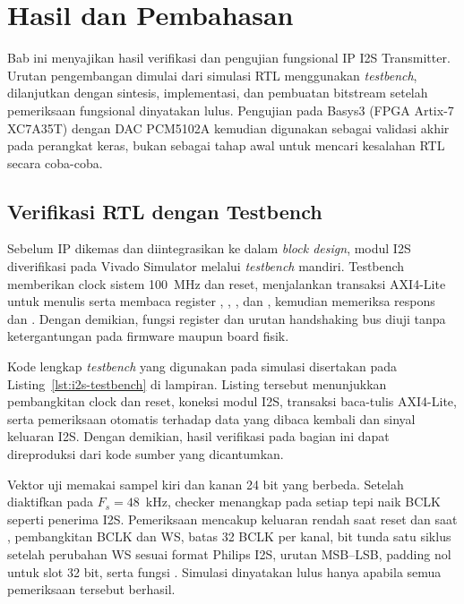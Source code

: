 \chapter{Hasil dan Pembahasan}

Bab ini menyajikan hasil verifikasi dan pengujian fungsional IP I2S Transmitter. Urutan pengembangan dimulai dari simulasi RTL menggunakan \textit{testbench}, dilanjutkan dengan sintesis, implementasi, dan pembuatan bitstream setelah pemeriksaan fungsional dinyatakan lulus. Pengujian pada Basys3 (FPGA Artix-7 XC7A35T) dengan DAC PCM5102A kemudian digunakan sebagai validasi akhir pada perangkat keras, bukan sebagai tahap awal untuk mencari kesalahan RTL secara coba-coba.

\section{Verifikasi RTL dengan Testbench}

Sebelum IP dikemas dan diintegrasikan ke dalam \textit{block design}, modul I2S diverifikasi pada Vivado Simulator melalui \textit{testbench} mandiri. Testbench memberikan clock sistem 100~MHz dan reset, menjalankan transaksi AXI4-Lite untuk menulis serta membaca register , , , dan , kemudian memeriksa respons  dan . Dengan demikian, fungsi register dan urutan handshaking bus diuji tanpa ketergantungan pada firmware maupun board fisik.

Kode lengkap \textit{testbench} yang digunakan pada simulasi disertakan pada Listing~\ref{lst:i2s-testbench} di lampiran. Listing tersebut menunjukkan pembangkitan clock dan reset, koneksi modul I2S, transaksi baca-tulis AXI4-Lite, serta pemeriksaan otomatis terhadap data yang dibaca kembali dan sinyal keluaran I2S. Dengan demikian, hasil verifikasi pada bagian ini dapat direproduksi dari kode sumber yang dicantumkan.

Vektor uji memakai sampel kiri dan kanan 24 bit yang berbeda. Setelah  diaktifkan pada $F_s=48$~kHz, checker menangkap  pada setiap tepi naik BCLK seperti penerima I2S. Pemeriksaan mencakup keluaran rendah saat reset dan saat , pembangkitan BCLK dan WS, batas 32 BCLK per kanal, bit tunda satu siklus setelah perubahan WS sesuai format Philips I2S, urutan MSB--LSB, padding nol untuk slot 32 bit, serta fungsi . Simulasi dinyatakan lulus hanya apabila semua pemeriksaan tersebut berhasil.

